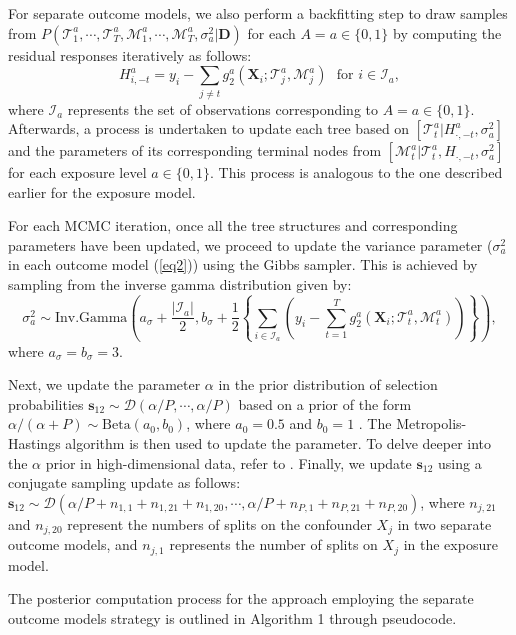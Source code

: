 For separate outcome models, we also perform a backfitting step to draw samples from $P(\mathcal{T}_1^a, \cdots, \mathcal{T}_T^a, \allowbreak \mathcal{M}_1^a, \cdots, \mathcal{M}_T^a, \sigma^2_a | \boldsymbol{D})$ for each $A = a \in \{0, 1\}$ by computing the residual responses iteratively as follows:
\[
H_{i,-t}^a = y_i - \sum_{j\neq t} g_2^a(\boldsymbol{X}_i; \mathcal{T}_j^a, \mathcal{M}_j^a) \,\, \text{ for } i \in \mathcal{I}_a, 
\]
where $\mathcal{I}_a$ represents the set of observations corresponding to $A=a \in \{0,1\}$. Afterwards, a process is undertaken to update each tree based on $[\mathcal{T}_t^a | H_{\cdot, -t}^a, \sigma_a^2]$ and the parameters of its corresponding terminal nodes from $[\mathcal{M}_t^a | \mathcal{T}_t^a, H_{\cdot, -t}, \sigma_a^2]$ for each exposure level $a \in \{0,1\}$. This process is analogous to the one described earlier for the exposure model.

For each MCMC iteration, once all the tree structures and corresponding parameters have been updated, we proceed to update the variance parameter ($\sigma^2_a$ in each outcome model (\ref{eq2})) using the Gibbs sampler. This is achieved by sampling from the inverse gamma distribution given by:
\begin{equation*}
\sigma^2_{a} \sim \text{Inv.Gamma}\left(a_\sigma+\frac{|\mathcal{I}_a|}{2}, b_\sigma+\frac{1}{2}\left\{\sum_{i \in \mathcal{I}_a} \left(y_i - \sum_{t=1}^T g_2^a(\boldsymbol{X}_i; \mathcal{T}_t^a, \mathcal{M}_t^a)\right) \right\}\right),
\end{equation*}
where $a_\sigma=b_\sigma=3$. 


Next, we update the parameter $\alpha$ in the prior distribution of selection probabilities $\boldsymbol{s}_{12} \sim \mathcal{D}(\alpha/P, \cdots, \alpha/P)$ based on a prior of the form $\alpha/(\alpha+P) \sim \text{Beta}(a_0, b_0)$, where $a_0=0.5$ and $b_0=1$ \citep{linero2018bayesian}. The Metropolis-Hastings algorithm is then used to update the parameter. To delve deeper into the $\alpha$ prior in high-dimensional data, refer to \cite{BART}. Finally, we update $\boldsymbol{s}_{12}$ using a conjugate sampling update as follows:
$\boldsymbol{s}_{12} \sim \mathcal{D}(\alpha/P+n_{1,1}+n_{1,21}+n_{1,20}, \cdots, \alpha/P+n_{P,1}+n_{P,21}+n_{P,20})$, where $n_{j,21}$ and $n_{j,20}$ represent the numbers of splits on the confounder $X_j$ in two separate outcome models, and $n_{j,1}$ represents the number of splits on $X_j$ in the exposure model.

The posterior computation process for the approach employing the separate outcome models strategy is outlined in Algorithm 1 through pseudocode.

